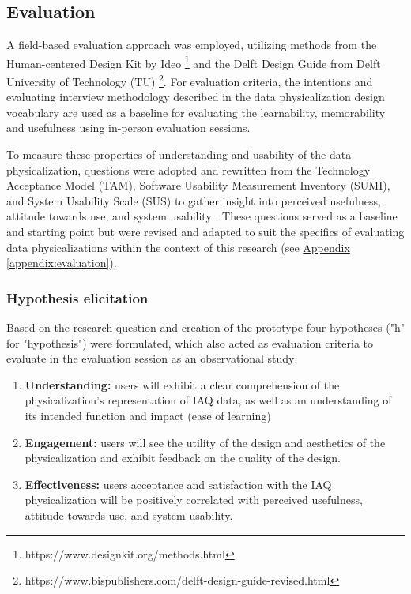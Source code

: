 \subsection{Evaluation}
\label{sec:evaluation}

A field-based evaluation approach was employed, utilizing methods from the Human-centered Design Kit by Ideo \footnote{https://www.designkit.org/methods.html} and the Delft Design Guide from Delft University of Technology (TU) \footnote{https://www.bispublishers.com/delft-design-guide-revised.html}. For evaluation criteria, the intentions and evaluating interview methodology described in the data physicalization design vocabulary \cite{jansen_evaluating_2013,ranasinghe_encoding_2023} are used as a baseline for evaluating the learnability, memorability and usefulness using in-person evaluation sessions. 

To measure these properties of understanding and usability of the data physicalization, questions were adopted and rewritten from the Technology Acceptance Model (TAM), Software Usability Measurement Inventory (SUMI), and System Usability Scale (SUS) to gather insight into perceived usefulness, attitude towards use, and system usability \cite{davis_perceived_1989, brooke_sus_1996}. These questions served as a baseline and starting point but were revised and adapted to suit the specifics of evaluating data physicalizations within the context of this research (see \hyperref[appendix:evaluation]{Appendix \ref*{appendix:evaluation}}).

\subsubsection{Hypothesis elicitation}

Based on the research question and creation of the prototype four hypotheses ("h" for "hypothesis") were formulated, which also acted as evaluation criteria to evaluate in the evaluation session as an observational study:

\begin{enumerate}
    \renewcommand{\labelenumi}{H\arabic{enumi}:}
    \item \textbf{Understanding:} users will exhibit a clear comprehension of the physicalization's representation of IAQ data, as well as an understanding of its intended function and impact (ease of learning)
    \item \textbf{Engagement:} users will see the utility of the design and aesthetics of the physicalization and exhibit feedback on the quality of the design.
    \item \textbf{Effectiveness:} users acceptance and satisfaction with the IAQ physicalization will be positively correlated with perceived usefulness, attitude towards use, and system usability.
\end{enumerate}

